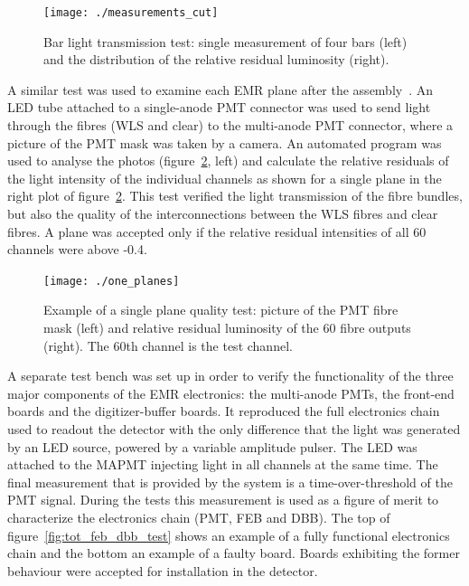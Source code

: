 \documentclass[a4paper,11pt]{article}
\begin{document}
\begin{figure}[htb]
 \centering
 \texttt{[image: ./measurements\_cut]}
 \caption[Bar quality test measurements]{Bar light transmission test: single measurement of four bars (left) and the distribution of the relative residual
 luminosity (right).}
 \label{fig:measurements}
\end{figure}

A similar test was used to examine each EMR plane after the assembly~\cite{emr_elquality}. An LED tube attached to a single-anode PMT connector was used
to send light through the fibres (WLS and clear) to the multi-anode PMT connector, where a picture of the PMT mask was taken by a camera. An automated
program was used to analyse the photos (figure~\ref{fig:plane_tests_one_planes}, left) and calculate the relative residuals of the light intensity
of the individual channels as shown for a single plane in the right plot of figure~\ref{fig:plane_tests_one_planes}. This test verified the light
transmission of the fibre bundles, but also the quality of the interconnections between the WLS fibres and clear fibres. A plane was accepted only if
the relative residual intensities of all 60 channels were above -0.4.

\begin{figure}[htb]
 \centering
 \texttt{[image: ./one\_planes]}
 \caption[Example of plane quality tests]{Example of a single plane quality test: picture of the PMT fibre mask (left) and relative residual luminosity
 of the 60 fibre outputs (right). The 60th channel is the test channel.}
 \label{fig:plane_tests_one_planes}
\end{figure}

A separate test bench was set up in order to verify the functionality of the three major components of the EMR electronics: the multi-anode PMTs, the 
front-end boards and the digitizer-buffer boards. It reproduced the full electronics chain used to readout the detector with the only difference that the
light was generated by an LED source, powered by a variable amplitude pulser. The LED was attached to the MAPMT injecting light in all channels at the
same time. The final measurement that is provided by the system is a time-over-threshold of the PMT signal. During the tests this measurement is used as
a figure of merit to characterize the electronics chain (PMT, FEB and DBB). The top of figure~\ref{fig:tot_feb_dbb_test} shows an example of a fully
functional electronics chain and the bottom an example of a faulty board. Boards exhibiting the former behaviour were accepted for installation in the
detector.
\end{document}
